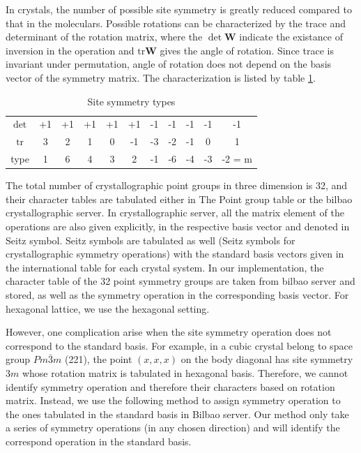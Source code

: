 \documentclass{article}
\begin{document}
In crystals, the number of possible site symmetry is greatly reduced compared to 
that in the moleculars. Possible rotations can be characterized by the trace 
and determinant of the rotation matrix, where the $\det\mathbf{W}$ indicate the 
existance of inversion in the operation and $\text{tr}\mathbf{W}$ gives the angle of rotation. 
Since trace is invariant under permutation, angle of rotation does not depend on the 
basis vector of the symmetry matrix. The characterization is listed by table \ref{T:operation_properties}.
\begin{table}[h]
    \centering
    \caption{Site symmetry types}
    \begin{tabular}{|c|cccccccccc|}
        \hline
        $\det$      & +1 & +1 & +1 & +1 & +1 & -1 & -1 & -1 & -1 & -1 \\ 
        $\text{tr}$ &  3 &  2 &  1 &  0 & -1 & -3 & -2 & -1 &  0 &  1 \\  
        \hline
        type        &  1 &  6 &  4 &  3 &  2 & -1 & -6 & -4 & -3 & -2 = m \\ 
        \hline
    \end{tabular}
    \label{T:operation_properties}
\end{table}

The total number of crystallographic point groups in three dimension is 32, and their character tables are 
tabulated either in The Point group table or the bilbao crystallographic server. In crystallographic
server, all the matrix element of the operations are also given explicitly, in the respective basis vector 
and denoted in Seitz symbol. Seitz symbols are tabulated as well (Seitz symbols for crystallographic symmetry operations)
with the standard basis vectors given in the international table for each crystal system. 
In our implementation, the character table of the 32 point symmetry groups are taken from bilbao server and 
stored, as well as the symmetry operation in the corresponding basis vector. For hexagonal lattice, we use the 
hexagonal setting.

However, one complication arise when the site symmetry operation does not correspond to the standard basis. For example, 
in a cubic crystal belong to space group $Pm\bar{3}m$ (221), the point $(x,x,x)$ on the body diagonal has site symmetry $3m$
whose rotation matrix is tabulated in hexagonal basis. Therefore, we cannot identify symmetry operation and therefore 
their characters based on rotation matrix. 
Instead, we use the following method to assign symmetry operation to the ones tabulated in the standard basis in Bilbao server. 
Our method only take a series of symmetry operations (in any chosen direction) and will identify the correspond 
operation in the standard basis. 
\end{document}
